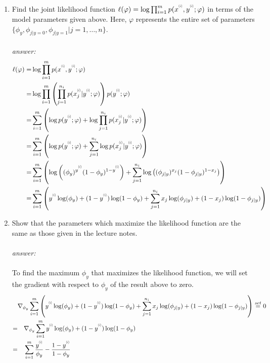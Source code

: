 \documentclass{article}
\newcommand{\supi}[1]{\scalebox{0.6}[0.75]{$^{(#1)}$}}
\begin{document}
\begin{enumerate}[label=(\alph*)]
    \item Find the joint likelihood function $\ell(\varphi) = \log\prod_{i=1}^mp(x^{\supi{i}}, y^{\supi{i}};\varphi)$ in terms of the model parameters given above. Here, $\varphi$ represents the entire set of parameters $\{\phi_y, \phi_{j|y=0}, \phi_{j|y=1} | j = 1,\dots,n\}$.\\\\
    \textit{answer:}
    \begin{align*}
        \ell(\varphi) =&{} \log\prod_{i=1}^mp(x^{\supi{i}}, y^{\supi{i}};\varphi)\\
        =&{}\log\prod_{i=1}^m\left(\prod_{j=1}^{n_i}p(x_j^{\supi{i}}|y^{\supi{i}};\varphi)\right)p(y^{\supi{i}};\varphi)\\
        =&{}\sum_{i=1}^m\left(\log p(y^{\supi{i}};\varphi) + \log\prod_{j=1}^{n_i}p(x_j^{\supi{i}}|y^{\supi{i}};\varphi)\right)\\
         =&{}\sum_{i=1}^m\left(\log p(y^{\supi{i}};\varphi) + \sum_{j=1}^{n_i}\log p(x_j^{\supi{i}}|y^{\supi{i}};\varphi)\right)\\
         =&{}\sum_{i=1}^m\left(\log\left((\phi_y)^{y^{\supi{i}}}(1-\phi_y)^{1-y^{\supi{i}}}\right) + \sum_{j=1}^{n_i}\log\left( (\phi_{j|y})^{x_j}(1-\phi_{j|y})^{1-x_j}\right)\right)\\
         =&{}\sum_{i=1}^m\left(y^{\supi{i}}\log(\phi_y) + (1-y^{\supi{i}})\log(1-\phi_y) + \sum_{j=1}^{n_i}x_j\log (\phi_{j|y})+(1-x_j)\log(1-\phi_{j|y})\right)
    \end{align*}
    \item Show that the parameters which maximize the likelihood function are the same as those given in the lecture notes.\\\\
    \textit{answer:}\\\\
    To find the maximum $\phi_y$ that maximizes the likelihood function, we will set the gradient with respect to $\phi_y$ of the result above to zero.
    \begin{align*}
       &{}\nabla_{\phi_y} \sum_{i=1}^m\left(y^{\supi{i}}\log(\phi_y) + (1-y^{\supi{i}})\log(1-\phi_y) + \sum_{j=1}^{n_i}x_j\log (\phi_{j|y})+(1-x_j)\log(1-\phi_{j|y})\right) \overset{set}= 0\\
       =&{}\quad \nabla_{\phi_y} \sum_{i=1}^my^{\supi{i}}\log(\phi_y) + (1-y^{\supi{i}})\log(1-\phi_y)\\
       =&{}\quad \sum_{i=1}^m\frac{y^{\supi{i}}}{\phi_y} - \frac{1-y^{\supi{i}}}{1-\phi_y}\\

\end{align*}
\end{enumerate}
\end{document}
